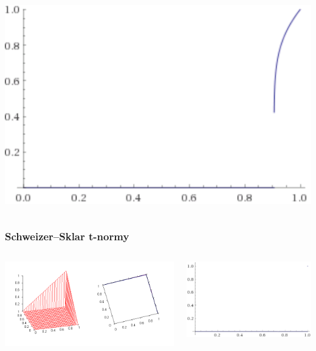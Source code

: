 \documentclass{beamer}
\begin{document}
\begin{frame}
\begin{columns}
\begin{minipage}[c][0.4\textheight][c]{\linewidth}
\end{minipage}
\begin{minipage}[c][0.4\textheight][c]{\linewidth}
  \centering
  \includegraphics[width=0.7\linewidth]{SS7-diag}
\end{minipage}\end{columns}
\end{frame}

\begin{frame}
\frametitle{Schweizer–Sklar t-normy}
\begin{columns}
\begin{minipage}[c][0.4\textheight][c]{\linewidth}
  \centering
  \includegraphics[width=1.1\linewidth]{DrasticTnorm}
\end{minipage}
\begin{minipage}[c][0.4\textheight][c]{\linewidth}
  \centering
  \includegraphics[width=0.7\linewidth]{drastDiag}
\end{minipage}
\end{columns}
\end{frame}
\end{document}
